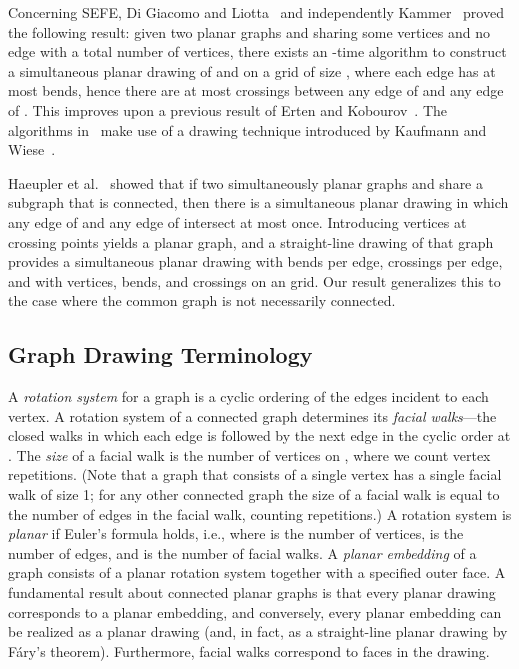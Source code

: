 \documentclass{llncs}
\begin{document}
Concerning SEFE, Di Giacomo and Liotta~\cite{dl-seogpc-07} and independently Kammer~\cite{k-setbepa-06} proved the following result: given two planar graphs  and  sharing some vertices and no edge with a total number of  vertices, there exists an -time algorithm to construct a simultaneous planar drawing of  and  on a grid of size , where each edge has at most  bends, hence there are at most  crossings between any edge of  and any edge of . This improves upon a previous result of Erten and Kobourov~\cite{EK}. The algorithms in~\cite{dl-seogpc-07,EK,k-setbepa-06} make use of a drawing technique introduced by Kaufmann and Wiese~\cite{KW}.

Haeupler et al.~\cite{HJL} showed that if two simultaneously planar graphs  and  share a subgraph  that is connected, then there is a simultaneous planar drawing in which any edge of  and any edge of  intersect at most once. Introducing vertices at crossing points yields a planar graph, and a straight-line drawing of that graph provides a simultaneous planar drawing with  bends per edge,  crossings per edge, and with vertices, bends, and crossings on an  grid. Our result generalizes this to the case where the common graph  is not necessarily connected.

\subsection{Graph Drawing Terminology}\label{sec:definitions}

A \emph{rotation system} for a graph is a cyclic ordering of the edges incident to each vertex.
A rotation system of a connected graph determines its {\em facial walks}---the closed walks in which each edge  is followed by the next edge  in the cyclic order at .
The {\em size}  of a facial walk  is the number of vertices on , where we count vertex repetitions.  (Note that a graph that consists of a single vertex has a single facial walk of size 1; for any other connected graph the size of a facial walk is equal to the number of edges in the facial walk, counting repetitions.)
A rotation system is \emph{planar} if Euler's formula holds, i.e.,  where  is the number of vertices,  is the number of edges, and  is the number of facial walks.
A \emph{planar embedding} of a graph consists of a planar rotation system together with a specified outer face.  A fundamental result about connected planar graphs is that every planar drawing corresponds to a planar embedding, and conversely, every planar embedding can be realized as a planar drawing (and, in fact, as a straight-line planar drawing by F\'ary's theorem).
Furthermore, facial walks correspond to faces in the drawing.
\end{document}
